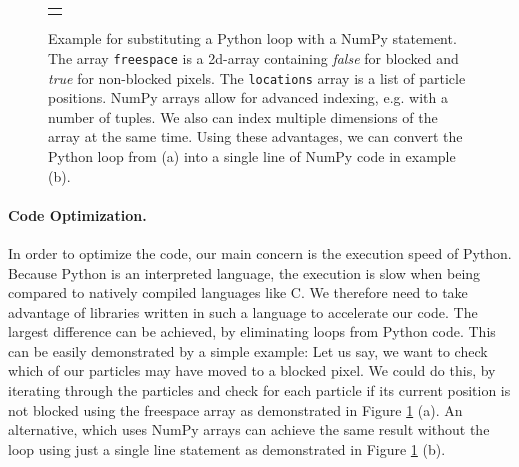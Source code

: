 \begin{figure}[htp]
    \begin{center}
        \begin{tabular}{c}
            \parbox{0.9\columnwidth}{} \\
             \\
            \addlinespace[0.5cm]
            \parbox{0.9\columnwidth}{} \\
             \\
            
        \end{tabular}
    \end{center}
    \vspace{-0.25cm}
    \caption[Example for Python Loop Substitution with NumPy]{Example for substituting a Python loop with a NumPy statement. The array \texttt{freespace} is a 2d-array containing \textit{false} for blocked and \textit{true} for non-blocked pixels. The \texttt{locations} array is a list of particle positions. NumPy arrays allow for advanced indexing, e.g. with a number of tuples. We also can index multiple dimensions of the array at the same time. Using these advantages, we can convert the Python loop from (a) into a single line of NumPy code in example (b).} \label{fig:MazeImplementation/Loops}
\end{figure}


\paragraph{Code Optimization. }
In order to optimize the code, our main concern is the execution speed of Python. Because Python is an interpreted language, the execution is slow when being compared to natively compiled languages like C. We therefore need to take advantage of libraries written in such a language to accelerate our code. The largest difference can be achieved, by eliminating loops from Python code. This can be easily demonstrated by a simple example: Let us say, we want to check which of our particles may have moved to a blocked pixel. We could do this, by iterating through the particles and check for each particle if its current position is not blocked using the freespace array as demonstrated in Figure \ref{fig:MazeImplementation/Loops} (a). An alternative, which uses NumPy arrays can achieve the same result without the loop using just a single line statement as demonstrated in Figure \ref{fig:MazeImplementation/Loops} (b). 

